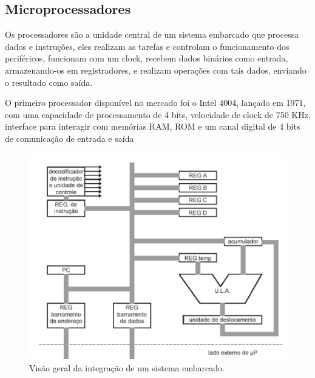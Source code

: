 \subsection{Microprocessadores}

Os processadores são a unidade central de um sistema embarcado que processa dados e instruções, eles realizam as tarefas e controlam o funcionamento dos periféricos, funcionam com um clock, recebem dados binários como entrada, armazenando-os em registradores, e realizam operações com tais dados, enviando o resultado como saída. 

O primeiro processador disponível no mercado foi o Intel 4004, lançado em 1971, com uma capacidade de processamento de 4 bits, velocidade de clock de 750 KHz,  interface para interagir com memórias RAM, ROM e um canal digital de 4 bits de comunicação de entrada e saída 

\begin{figure}[ht]
    \begin{center}
    \includegraphics{figuras/processor.PNG}
    \end{center}
    \caption[Sistema embarcado]{Visão geral da integração de um sistema embarcado.}
    \label{processor}
\end{figure}


